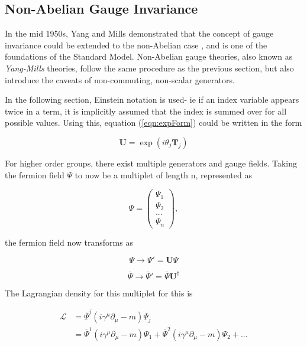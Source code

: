 \documentclass{article}
\begin{document}
\subsection{Non-Abelian Gauge Invariance}%
\label{sec:SM_naGI}
In the mid 1950s, Yang and Mills demonstrated that the concept of gauge invariance could be extended to the non-Abelian case \cite{YangMillsTheory}, and is one of the foundations of the Standard Model. Non-Abelian gauge theories, also known as \textit{Yang-Mills} theories, follow the same procedure as the previous section, but also introduce the caveats of non-commuting, non-scalar generators.

In the following section, Einstein notation is used- ie if an index variable appears twice in a term, it is implicitly assumed that the index is summed over for all possible values. Using this, equation (\ref{eqn:expForm}) could be written in the form

\begin{equation}
\bm{U} = \exp(i\theta_j \bm{T}_j)
\end{equation}

For higher order groups, there exist multiple generators and gauge fields. Taking the fermion field $\Psi$ to now be a multiplet of length n, represented as

\begin{equation}
\label{matrix:femionMultiplet}
\Psi = 
\left(
\begin{matrix}
    \Psi_1  \\
    \Psi_2  \\
    ...     \\
    \Psi_n
\end{matrix}
\right),
\end{equation}

the fermion field now transforms as 

\begin{equation}
\label{eqn:nonAbelianFermionFieldTransformation}
\Psi\rightarrow\Psi'=\bm{U}\Psi
\end{equation}

\begin{equation}
\overline{\Psi}\rightarrow\overline{\Psi}' = \overline{\Psi}\bm{U}^\dagger
\end{equation}

The Lagrangian density for this multiplet for this is 

\begin{equation}
\begin{split}
\mathcal{L} & = \overline{\Psi}^j(i \gamma^\mu \partial_\mu -m )\Psi_j \\
& = \overline{\Psi}^1 (i \gamma^\mu \partial_\mu - m)\Psi_1 + \overline{\Psi}^2 (i \gamma^\mu \partial_\mu - m)\Psi_2 + ...
\end{split}
\end{equation}
\end{document}
